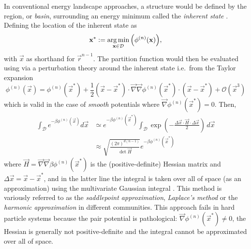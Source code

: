 \documentclass[11pt,twoside]{report}
\begin{document}
In conventional energy landscape approaches, a structure%
would be defined by the region, or \emph{basin}, surrounding an energy minimum called the \emph{inherent state} \cite{StillingerPRA1982,StillingerS1995,Wales2004}.
Defining the location of the inherent state as
\begin{equation*}
  \boldsymbol{\mathbf{x}}^*
  :=
  \operatorname*{arg\,min}_{\boldsymbol{\mathbf{x}} \in \mathcal{D}}{\left( \phi^{(n)}(\boldsymbol{\mathbf{x}}) \right)},
\end{equation*}
with $\vec{x}$ as shorthand for $\vec{r}^{n-1}$.
The partition function would then be evaluated using via a perturbation theory around the inherent state i.e.\ from the Taylor expansion \cite{Wales2004}
\begin{equation*}
  \phi^{(n)}(\vec{x})
  =
  \phi^{(n)}(\vec{x}^*)
  + \frac{1}{2} (\vec{x} - \vec{x}^*) \cdot
  \vec{\nabla}\vec{\nabla} \phi^{(n)}(\vec{x}^*)
  \cdot (\vec{x} - \vec{x}^*)
  + \mathcal{O}(\vec{x}^3)
\end{equation*}
which is valid in the case of \emph{smooth} potentials where $\vec{\nabla} \phi^{(n)}(\vec{x}^*) = 0$.
Then, \cite{Wales2004}
\begin{equation}\label{eq:harmonic-approximation}
  \begin{split}
    \int_\mathcal{D} e^{-\beta\phi^{(n)}(\vec{x})} d\vec{x}
    &\simeq
    e^{-\beta\phi^{(n)}(\vec{x}^*)}
    \int_\mathcal{D}
    \exp{\left( - \frac{\Delta\vec{x} \cdot \vec{H} \cdot \Delta\vec{x}}{2} \right)}
    \, d\vec{x}
    \\ &\approx
    \sqrt{ \frac{(2\pi)^{d(n-1)}}{\det \vec{H}} }
    e^{-\beta\phi^{(n)}(\vec{x}^*)}
  \end{split}
\end{equation}
where $\vec{H} = \vec{\nabla}\vec{\nabla} \beta \phi^{(n)}(\vec{x}^*)$ is the (positive-definite) Hessian matrix and $\Delta \vec{x} = \vec{x} - \vec{x}^*$, and in the latter line the integral is taken over all of space (as an approximation) using the multivariate Gaussian integral%
.
This method is variously referred to as the \emph{saddlepoint approximation}, \emph{Laplace's method} or the \emph{harmonic approximation} in different communities.
This approach fails in hard particle systems because the pair potential is pathological: $\vec{\nabla} \phi^{(n)}(\vec{x}^*) \ne 0$, the Hessian is generally not positive-definite and the integral cannot be approximated over all of space.
\end{document}
